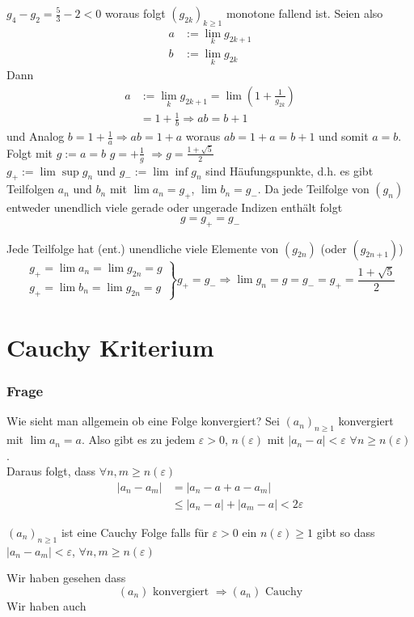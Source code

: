 \noindent$g_4-g_2=\frac{5}{3}-2<0$ woraus folgt $\left( g_{2k}\right)_{k\geq 1}$ monotone fallend ist. Seien also 
\begin{align*}
a&:=\lim_k g_{2k+1}\\
b&:=\lim_k g_{2k}
\end{align*}
Dann
\begin{align*}
a&:=\lim_k g_{2k+1}=\lim\left( 1+\frac{1}{g_{2k}}\right)\\
&=1+\frac{1}{b}\Rightarrow ab=b+1
\end{align*}
und Analog $b=1+\frac{1}{a}\Rightarrow ab=1+a$ woraus $ab=1+a=b+1$ und somit $a=b$. Folgt mit $g:=a=b$ $g=+\frac{1}{g}$ $\Rightarrow g=\frac{1+\sqrt{5}}{2}$\\

$g_+:=\lim\sup g_n$ und $g_-:=\lim\inf g_n$ sind Häufungspunkte, d.h. es gibt Teilfolgen $a_n$ und $b_n$ mit $\lim a_n=g_+$, $\lim b_n=g_-$. Da jede Teilfolge von $\left( g_n\right)$ entweder unendlich viele gerade oder ungerade Indizen enthält folgt 
\[g=g_+=g_-\]

Jede Teilfolge hat (ent.) unendliche viele Elemente von $\left( g_{2n}\right)$ (oder $\left( g_{2n+1}\right)$)
\[\left. {\begin{array}{*{20}{c}}
{{g_ + } = \lim {a_n} = \lim {g_{2n}} = g}\\
{{g_ + } = \lim {b_n} = \lim {g_{2n}} = g}
\end{array}} \right\}{g_ + } = {g_ - } \Rightarrow \lim {g_n} = g = {g_ - } = {g_ + } = \frac{{1 + \sqrt 5 }}{2}\]

\section{Cauchy Kriterium}
\subsubsection*{Frage}
Wie sieht man allgemein ob eine Folge konvergiert? Sei $\left( a_n\right)_{n\geq 1}$ konvergiert mit $\lim a_n=a$. Also gibt es zu jedem $\varepsilon>0$, $n(\varepsilon)$ mit $\left| a_n-a\right|<\varepsilon$ $\forall n\geq n(\varepsilon)$ .\\
Daraus folgt, dass $\forall n,m\geq n(\varepsilon)$ 
\begin{align*}
\left|a_n-a_m\right|&= \left| a_n-a+a-a_m\right|\\
&\leq \left| a_n-a \right|+\left| a_m-a\right| < 2\varepsilon
\end{align*}
\begin{definition}{3.21}
$\left( a_n\right)_{n\geq 1}$ ist eine Cauchy Folge falls für $\varepsilon>0$ ein $n(\varepsilon)\geq 1$ gibt so dass $\left| a_n-a_m\right|<\varepsilon$, $\forall n,m\geq n(\varepsilon)$
\end{definition}
Wir haben gesehen dass 
\[ \left( a_n\right) \text{ konvergiert }\Rightarrow\left( a_n\right) \text{ Cauchy}\]
Wir haben auch
